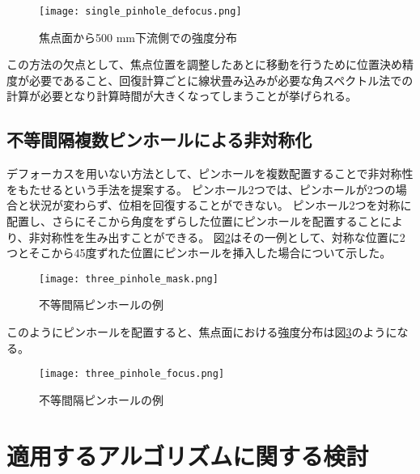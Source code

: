 \begin{figure}[!ht]
\centering
\texttt{[image: single\_pinhole\_defocus.png]}
\caption{焦点面から500 mm下流側での強度分布}
\label{fig:single_pinhole_defocus}
\end{figure}

この方法の欠点として、焦点位置を調整したあとに移動を行うために位置決め精度が必要であること、回復計算ごとに線状畳み込みが必要な角スペクトル法での計算が必要となり計算時間が大きくなってしまうことが挙げられる。

\subsection{不等間隔複数ピンホールによる非対称化}
デフォーカスを用いない方法として、ピンホールを複数配置することで非対称性をもたせるという手法を提案する。
ピンホール2つでは、ピンホールが2つの場合と状況が変わらず、位相を回復することができない。
ピンホール2つを対称に配置し、さらにそこから角度をずらした位置にピンホールを配置することにより、非対称性を生み出すことができる。
図\ref{fig:three_pinhole_mask}はその一例として、対称な位置に2つとそこから45度ずれた位置にピンホールを挿入した場合について示した。

\begin{figure}[!ht]
\centering
\texttt{[image: three\_pinhole\_mask.png]}
\caption{不等間隔ピンホールの例}
\label{fig:three_pinhole_mask}
\end{figure}

このようにピンホールを配置すると、焦点面における強度分布は図\ref{fig:three_pinhole_focus}のようになる。

\begin{figure}[!ht]
\centering
\texttt{[image: three\_pinhole\_focus.png]}
\caption{不等間隔ピンホールの例}
\label{fig:three_pinhole_focus}
\end{figure}

\clearpage
\newpage

\section{適用するアルゴリズムに関する検討}
\label{chap3_algorithm}



\clearpage
\newpage

